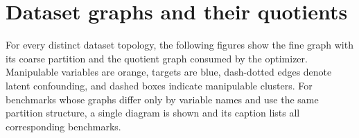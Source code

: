 \documentclass[twoside]{article}
\begin{document}
\section{Dataset graphs and their quotients}
\label{app:dags}

For every distinct dataset topology, the following figures show the fine graph with its coarse partition and the quotient graph consumed by the optimizer. Manipulable variables are orange, targets are blue, dash-dotted edges denote latent confounding, and dashed boxes indicate manipulable clusters. For benchmarks whose graphs differ only by variable names and use the same partition structure, a single diagram is shown and its caption lists all corresponding benchmarks.

\begingroup
\let\savedfigure\figure
\let\endsavedfigure\endfigure
\renewenvironment{figure}[1][]{\savedfigure[H]}{\endsavedfigure}

\endgroup
\clearpage
\end{document}
